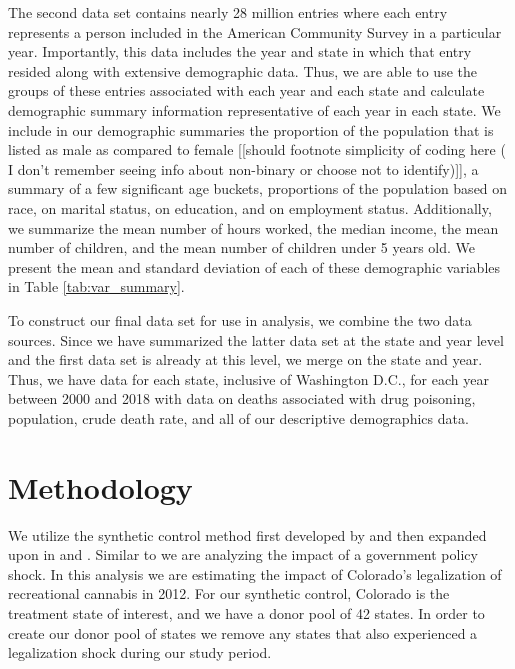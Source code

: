 \documentclass{article}
\begin{document}
The second data set contains nearly 28 million entries where each entry represents a person included in the American Community Survey in a particular year.  Importantly, this data includes the year and state in which that entry resided along with extensive demographic data. Thus, we are able to use the groups of these entries associated with each year and each state and calculate demographic summary information representative of each year in each state. We include in our demographic summaries the proportion of the population that is listed as male as compared to female [[should footnote simplicity of coding here ( I don't remember seeing info about non-binary or choose not to identify)]], a summary of a few significant age buckets, proportions of the population based on race, on marital status, on education, and on employment status. Additionally, we summarize the mean number of hours worked, the median income, the mean number of children, and the mean number of children under 5 years old. We present the mean and standard deviation of each of these demographic variables in Table \ref{tab:var_summary}.

To construct our final data set for use in analysis, we combine the two data sources. Since we have summarized the latter data set at the state and year level and the first data set is already at this level, we merge on the state and year. Thus, we have data for each state, inclusive of Washington D.C., for each year between 2000 and 2018 with data on deaths associated with drug poisoning, population, crude death rate, and all of our descriptive demographics data.



\section{Methodology}

We utilize the synthetic control method first developed by \citet{AbadieA2003TECo} and then expanded upon in \citet{AbadieAlberto2010SCMf} and \citet{AbadieAlberto2015CPat}. Similar to \citet{AbadieAlberto2010SCMf} we are analyzing the impact of a government policy shock. In this analysis we are estimating the impact of Colorado's legalization of recreational cannabis in 2012. For our synthetic control, Colorado is the treatment state of interest, and we have a donor pool of 42 states. In order to create our donor pool of states we remove any states that also experienced a legalization shock during our study period.
\end{document}
